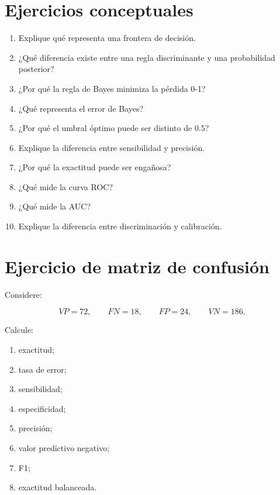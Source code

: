 \documentclass[
  spanish,
  10.5pt,
  letterpaper,
  DIV=11,
  numbers=noendperiod,
  oneside,
  open=any]{scrreprt}
\providecommand{\tightlist}{%
  \setlength{\itemsep}{0pt}\setlength{\parskip}{0pt}}
\theoremstyle{definition}
\theoremstyle{definition}
\theoremstyle{plain}
\theoremstyle{remark}
\begin{document}
\section*{Ejercicios conceptuales}\label{ejercicios-conceptuales-5}


\begin{enumerate}
\def\labelenumi{\arabic{enumi}.}
\tightlist
\item
  Explique qué representa una frontera de decisión.
\item
  ¿Qué diferencia existe entre una regla discriminante y una
  probabilidad posterior?
\item
  ¿Por qué la regla de Bayes minimiza la pérdida 0-1?
\item
  ¿Qué representa el error de Bayes?
\item
  ¿Por qué el umbral óptimo puede ser distinto de \(0.5\)?
\item
  Explique la diferencia entre sensibilidad y precisión.
\item
  ¿Por qué la exactitud puede ser engañosa?
\item
  ¿Qué mide la curva ROC?
\item
  ¿Qué mide la AUC?
\item
  Explique la diferencia entre discriminación y calibración.
\end{enumerate}

\section*{Ejercicio de matriz de
confusión}\label{ejercicio-de-matriz-de-confusiuxf3n}


Considere:

\[
VP=72,
\qquad
FN=18,
\qquad
FP=24,
\qquad
VN=186.
\]

Calcule:

\begin{enumerate}
\def\labelenumi{\arabic{enumi}.}
\tightlist
\item
  exactitud;
\item
  tasa de error;
\item
  sensibilidad;
\item
  especificidad;
\item
  precisión;
\item
  valor predictivo negativo;
\item
  F1;
\item
  exactitud balanceada.
\end{enumerate}
\end{document}
